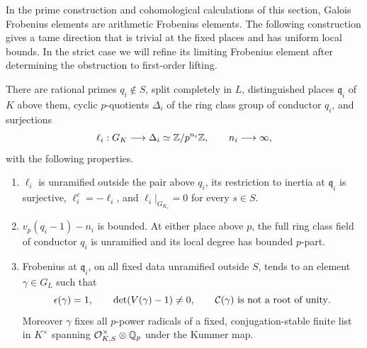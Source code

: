 In the prime construction and cohomological calculations of this section,
Galois Frobenius elements are arithmetic Frobenius elements.
The following construction gives a tame direction that is trivial at
the fixed places and has uniform local bounds.  In the strict case
we will refine its limiting Frobenius element after determining the
obstruction to first-order lifting.

\begin{proposition}\label{prop:tame-primes}
There are rational primes $q_i\notin S$, split completely in $L$,
distinguished places $\mathfrak q_i$ of $K$ above them, cyclic
$p$-quotients $\Delta_i$ of the ring class group of conductor $q_i$,
and surjections
\[
 \ell_i:G_K\longrightarrow\Delta_i\simeq\mathbb Z/p^{n_i}\mathbb Z,
 \qquad n_i\longrightarrow\infty,
\]
with the following properties.
\begin{enumerate}[label=\textup{(\roman*)}]
\item $\ell_i$ is unramified outside the pair above $q_i$,
its restriction to inertia at $\mathfrak q_i$ is surjective,
$\ell_i^c=-\ell_i$, and $\ell_i|_{G_{K_s}}=0$ for every $s\in S$.
\item $v_p(q_i-1)-n_i$ is bounded.  At either place above $p$, the
full ring class field of conductor $q_i$ is unramified and its local
degree has bounded $p$-part.
\item Frobenius at $\mathfrak q_i$, on all fixed data unramified
outside $S$, tends to an element $\gamma\in G_L$ such that
\[
 \epsilon(\gamma)=1,\qquad
 \det(V(\gamma)-1)\ne0,\qquad
 \mathcal C(\gamma)\text{ is not a root of unity}.
\]
Moreover $\gamma$ fixes all $p$-power radicals of a fixed,
conjugation-stable finite list in $K^\times$ spanning
$\mathcal O_{K,S}^{\times}\otimes\mathbb Q_p$ under the Kummer map.
\end{enumerate}
\end{proposition}

